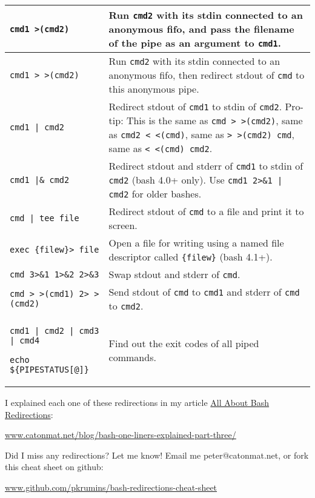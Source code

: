 \documentclass[9pt]{memoir}
\begin{document}
\begin{tabular}{|m{5.5cm}|m{12.2cm}|}
\hline
\verb/cmd1 >(cmd2)/ & Run \verb|cmd2| with its stdin connected to an anonymous fifo, and pass the filename of the pipe as an argument to \verb|cmd1|. \\
\hline
\verb/cmd1 > >(cmd2)/ & Run \verb|cmd2| with its stdin connected to an anonymous fifo, then redirect stdout of \verb|cmd| to this anonymous pipe. \\
\hline
\verb/cmd1 | cmd2/ & Redirect stdout of \verb|cmd1| to stdin of \verb|cmd2|. Pro-tip: This is the same as \verb|cmd > >(cmd2)|, same as \verb|cmd2 < <(cmd)|, same as \verb|> >(cmd2) cmd|, same as \verb|< <(cmd) cmd2|. \\
\hline
\verb/cmd1 |& cmd2/ & Redirect stdout and stderr of \verb|cmd1| to stdin of \verb|cmd2| (bash 4.0+ only). Use \verb/cmd1 2>&1 | cmd2/ for older bashes. \\
\hline
\verb/cmd | tee file/ & Redirect stdout of \verb|cmd| to a file and print it to screen. \\
\hline
\verb|exec {filew}> file| & Open a file for writing using a named file descriptor called \verb|{filew}| (bash 4.1+). \\
\hline
\verb|cmd 3>&1 1>&2 2>&3| & Swap stdout and stderr of \verb|cmd|. \\
\hline
\verb|cmd > >(cmd1) 2> >(cmd2)| & Send stdout of \verb|cmd| to \verb|cmd1| and stderr of \verb|cmd| to \verb|cmd2|. \\
\hline
\verb/cmd1 | cmd2 | cmd3 | cmd4/ \par
\verb/echo ${PIPESTATUS[@]}/ & Find out the exit codes of all piped commands. \\
\hline
\end{tabular}

\vfill

I explained each one of these redirections in my article \href{http://www.catonmat.net/blog/bash-one-liners-explained-part-three/}{All About Bash Redirections}: \par
\href{http://www.catonmat.net/blog/bash-one-liners-explained-part-three/}{www.catonmat.net/blog/bash-one-liners-explained-part-three/}

\vfill

Did I miss any redirections? Let me know! Email me peter@catonmat.net, or fork this cheat sheet on github: \par \href{http://github.com/pkrumins/bash-redirections-cheat-sheet}{www.github.com/pkrumins/bash-redirections-cheat-sheet}

\vfill

\end{document}
